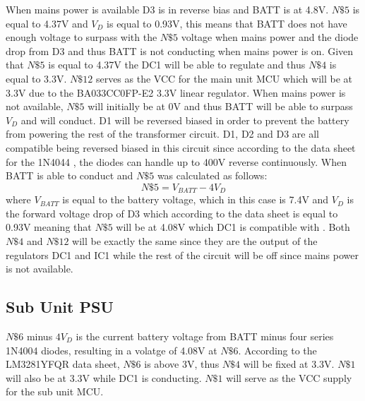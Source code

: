 When mains power is available D3 is in reverse bias and BATT is at 4.8\si{\V}. $N\$5$ is equal to 4.37\si{\V} and $V_{D}$ is equal to 0.93\si{\V}, this means that BATT does not have enough voltage to surpass with the $N\$5$ voltage when mains power and the diode drop from D3 and thus BATT is not conducting when mains power is on. Given that $N\$5$ is equal to 4.37\si{\V} the DC1 will be able to regulate and thus $N\$4$ is equal to 3.3\si{\V}. $N\$12$ serves as the VCC for the main unit MCU which will be at 3.3V due to the BA033CC0FP-E2 3.3V linear regulator. When mains power is not available, $N\$5$ will initially be at 0\si{\V} and thus BATT will be able to surpass $V_{D}$ and will conduct. D1 will be reversed biased in order to prevent the battery from powering the rest of the transformer circuit. D1, D2 and D3 are all compatible being reversed biased in this circuit since according to the data sheet for the 1N4044 \cite{1N4004RLG}, the diodes can handle up to 400\si{\V} reverse continuously. When BATT is able to conduct and $N\$5$ was calculated as follows:
\begin{equation}
  N\$5 = V_{BATT} - 4V_{D}
  \label{eq:main-N5-BATT}
\end{equation}
where $V_{BATT}$ is equal to the battery voltage, which in this case is 7.4\si{\V} and $V_{D}$ is the forward voltage drop of D3 which according to the data sheet \cite{1N4004RLG} is equal to 0.93\si{\V} meaning that $N\$5$ will be at 4.08\si{\V} which DC1 is compatible with \cite{LM3281YFQR}. Both $N\$4$ and $N\$12$ will be exactly the same since they are the output of the regulators DC1 and IC1 while the rest of the circuit will be off since mains power is not available.
\subsection{Sub Unit PSU}
$N\$6$ minus $4V_{D}$ is the current battery voltage from BATT minus four series 1N4004 diodes, resulting in a volatge of 4.08\si{\V} at $N\$6$. According to the LM3281YFQR data sheet, \cite{LM3281YFQR} $N\$6$ is above 3\si{\V}, thus $N\$4$ will be fixed at 3.3\si{\V}. $N\$1$ will also be at 3.3\si{\V} while DC1 is conducting. $N\$1$ will serve as the VCC supply for the sub unit MCU.

